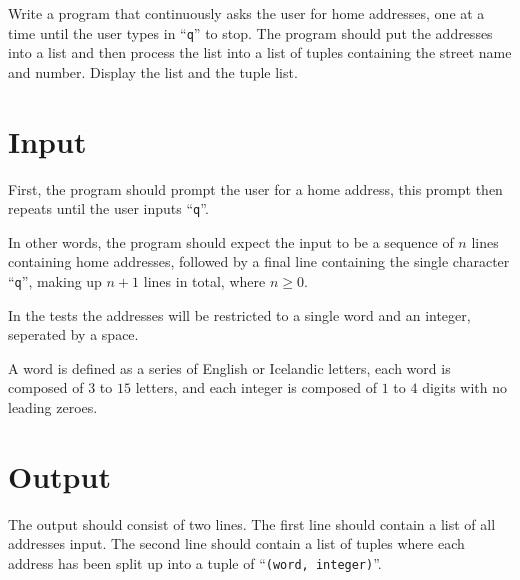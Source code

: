
Write a program that continuously asks the user for home addresses, 
one at a time until the user types in ``\texttt{q}'' to stop.
The program should put the addresses into a list and then process 
the list into a list of tuples containing the street name and number.
Display the list and the tuple list.

\section*{Input}
First, the program should prompt the user for a home address,
this prompt then repeats until the user inputs ``\texttt{q}''.

In other words, the program should expect the input to be
a sequence of $n$ lines containing home addresses,
followed by a final line containing the single character ``\texttt{q}'',
making up $n + 1$ lines in total, where $n \ge 0$.

In the tests the addresses will be restricted to a single word 
and an integer, seperated by a space.

A word is defined as a series of English or Icelandic letters,
each word is composed of $3$ to $15$ letters,
and each integer is composed of $1$ to $4$ digits with no leading zeroes.

\section*{Output}
The output should consist of two lines.
The first line should contain a list of all addresses input.
The second line should contain a list of tuples where each address has been split up into a tuple of ``\texttt{(word, integer)}''.
